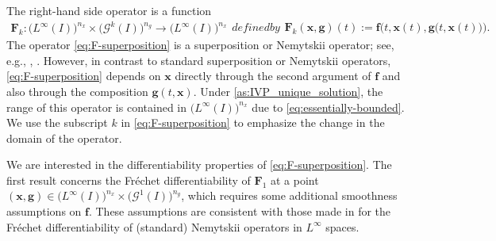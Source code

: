 \documentclass[onefignum,onetabnum]{siamart220329}
\numberwithin{equation}{section}
\newcommand{\bff}{\ensuremath{\mathbf{f}}} %
\newcommand{\bg}{\ensuremath{\mathbf{g}}} %
\newcommand{\bx}{\ensuremath{\mathbf{x}}} %
\newcommand{\BF}{\ensuremath{\mathbf{F}} } %
\newcommand {\cG} {\mathcal{G}}
\newcommand{\LL}{\big(L^\infty(I) \big)^{n_x}}
\begin{document}
The right-hand side operator is a function
\begin{subequations}   \label{eq:F-superposition}
\begin{align}
     \BF_k:   \LL \times \big(\cG^k(I)\big)^{n_g} \rightarrow  \LL
\end{align}
defined by
\begin{align}
	\BF_k(\bx, \bg)(t) := \bff\Big(t, \bx(t), \bg\big(t, \bx(t)\big)\Big).
\end{align}
\end{subequations}
The operator \cref{eq:F-superposition} is a superposition or Nemytskii operator; see, e.g., 
\cite{JAppell_PPZabrejko_1990a},  \cite[Sec.~4.3.2]{FTroeltzsch_2010a}.
However, in contrast to standard superposition or Nemytskii operators,
\cref{eq:F-superposition} depends on $\bx$ directly through the second argument of $\bff$ and
also through the composition $\bg(t, \bx)$. 
Under \cref{as:IVP_unique_solution}, the range of this operator is contained in $\LL$ due to \cref{eq:essentially-bounded}.
We use the subscript $k$ in \cref{eq:F-superposition} to emphasize the change in the domain of the operator. 




We are interested in the differentiability properties of \cref{eq:F-superposition}.
The first result concerns the Fr\'echet differentiability of $\BF_1$ at a point $(\bx, \bg) \in \LL \times \big(\cG^1(I)\big)^{n_g}$, which requires
some additional smoothness assumptions on $\bff$. These assumptions are consistent with those made in \cite[Sec.~4.3.2]{FTroeltzsch_2010a} 
for the Fr\'echet differentiability
of (standard) Nemytskii operators in $L^\infty$ spaces. 
\end{document}

